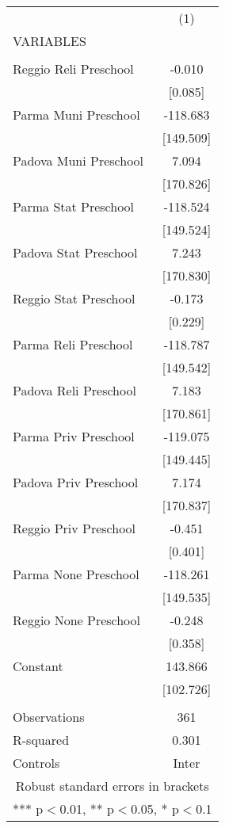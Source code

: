 \begin{tabular}{lc} \hline
 & (1) \\
VARIABLES &  \\ \hline
 &  \\
Reggio Reli Preschool & -0.010 \\
 & [0.085] \\
Parma Muni Preschool & -118.683 \\
 & [149.509] \\
Padova Muni Preschool & 7.094 \\
 & [170.826] \\
Parma Stat Preschool & -118.524 \\
 & [149.524] \\
Padova Stat Preschool & 7.243 \\
 & [170.830] \\
Reggio Stat Preschool & -0.173 \\
 & [0.229] \\
Parma Reli Preschool & -118.787 \\
 & [149.542] \\
Padova Reli Preschool & 7.183 \\
 & [170.861] \\
Parma Priv Preschool & -119.075 \\
 & [149.445] \\
Padova Priv Preschool & 7.174 \\
 & [170.837] \\
Reggio Priv Preschool & -0.451 \\
 & [0.401] \\
Parma None Preschool & -118.261 \\
 & [149.535] \\
Reggio None Preschool & -0.248 \\
 & [0.358] \\
Constant & 143.866 \\
 & [102.726] \\
 &  \\
Observations & 361 \\
R-squared & 0.301 \\
 Controls & Inter \\ \hline
\multicolumn{2}{c}{ Robust standard errors in brackets} \\
\multicolumn{2}{c}{ *** p$<$0.01, ** p$<$0.05, * p$<$0.1} \\
\end{tabular}
